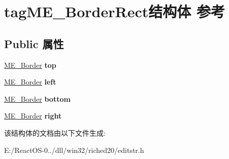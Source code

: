 \hypertarget{structtag_m_e___border_rect}{}\section{tag\+M\+E\+\_\+\+Border\+Rect结构体 参考}
\label{structtag_m_e___border_rect}
\subsection*{Public 属性}
\begin{DoxyCompactItemize}
\item 
\mbox{\label{structtag_m_e___border_rect_af99e94dfd1cac270d06a17762efe1442}} 
\hyperlink{structtag_m_e___border}{M\+E\+\_\+\+Border} {\bfseries top}
\item 
\mbox{\label{structtag_m_e___border_rect_ad651671be957a25a443675ce286dd325}} 
\hyperlink{structtag_m_e___border}{M\+E\+\_\+\+Border} {\bfseries left}
\item 
\mbox{\label{structtag_m_e___border_rect_ab86e85db88de12dba849f34de8074409}} 
\hyperlink{structtag_m_e___border}{M\+E\+\_\+\+Border} {\bfseries bottom}
\item 
\mbox{\label{structtag_m_e___border_rect_ad2aeb21ccf74ac200d1cedcccfa9ecda}} 
\hyperlink{structtag_m_e___border}{M\+E\+\_\+\+Border} {\bfseries right}
\end{DoxyCompactItemize}


该结构体的文档由以下文件生成\+:\begin{DoxyCompactItemize}
\item 
E\+:/\+React\+O\+S-\/0../dll/win32/riched20/editstr.\+h\end{DoxyCompactItemize}
